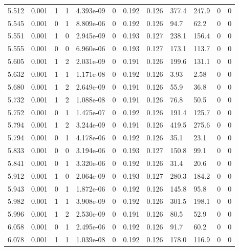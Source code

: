 \documentclass[preview]{standalone}
\begin{document}
{{{{\begin{tabular}{L{1.2cm}C{1.2cm} C{0.3cm}C{0.5cm} C{1.4cm}C{1.4cm} C{1.4cm}C{1.4cm} C{1.6cm}C{1.6cm} C{1.6cm}C{1.6cm}}
  5.512  &  0.001  & 1     &  1 &  4.393e-09  & 0  &  0.192&   0.126& 377.4 & 247.9   &  0 & 0  \\ 
  5.545  &  0.001  & 0     &  1 &  8.809e-06  & 0  &  0.192&   0.126& 94.7 & 62.2   &  0 & 0  \\ 
  5.551  &  0.001  & 1     &  0 &  2.945e-09  & 0  &  0.193&   0.127& 238.1 & 156.4   &  0 & 0  \\ 
  5.555  &  0.001  & 0     &  0 &  6.960e-06  & 0  &  0.193&   0.127& 173.1 & 113.7   &  0 & 0  \\ 
  5.605  &  0.001  & 1     &  2 &  2.031e-09  & 0  &  0.191&   0.126& 199.6 & 131.1   &  0 & 0  \\ 
  5.632  &  0.001  & 1     &  1 &  1.171e-08  & 0  &  0.192&   0.126& 3.93 & 2.58   &  0 & 0  \\ 
  5.680  &  0.001  & 1     &  2 &  2.649e-09  & 0  &  0.191&   0.126& 55.9 & 36.8   &  0 & 0  \\ 
  5.732  &  0.001  & 1     &  2 &  1.088e-08  & 0  &  0.191&   0.126& 76.8 & 50.5   &  0 & 0  \\ 
  5.752  &  0.001  & 0     &  1 &  1.475e-07  & 0  &  0.192&   0.126& 191.4 & 125.7   &  0 & 0  \\ 
  5.794  &  0.001  & 1     &  2 &  3.244e-09  & 0  &  0.191&   0.126& 419.5 & 275.6   &  0 & 0  \\ 
  5.794  &  0.001  & 0     &  1 &  4.178e-06  & 0  &  0.192&   0.126& 35.1 & 23.1   &  0 & 0  \\ 
  5.833  &  0.001  & 0     &  0 &  3.194e-06  & 0  &  0.193&   0.127& 150.8 & 99.1   &  0 & 0  \\ 
  5.841  &  0.001  & 0     &  1 &  3.320e-06  & 0  &  0.192&   0.126& 31.4 & 20.6   &  0 & 0  \\ 
  5.912  &  0.001  & 1     &  0 &  2.064e-09  & 0  &  0.193&   0.127& 280.3 & 184.2   &  0 & 0  \\ 
  5.943  &  0.001  & 0     &  1 &  1.872e-06  & 0  &  0.192&   0.126& 145.8 & 95.8   &  0 & 0  \\ 
  5.982  &  0.001  & 1     &  1 &  3.908e-09  & 0  &  0.192&   0.126& 301.5 & 198.1   &  0 & 0  \\ 
  5.996  &  0.001  & 1     &  2 &  2.530e-09  & 0  &  0.191&   0.126& 80.5 & 52.9   &  0 & 0  \\ 
  6.058  &  0.001  & 0     &  1 &  2.495e-06  & 0  &  0.192&   0.126& 91.7 & 60.2   &  0 & 0  \\ 
  6.078  &  0.001  & 1     &  1 &  1.039e-08  & 0  &  0.192&   0.126& 178.0 & 116.9   &  0 & 0  \\ 

\end{tabular}}}}}
\end{document}

